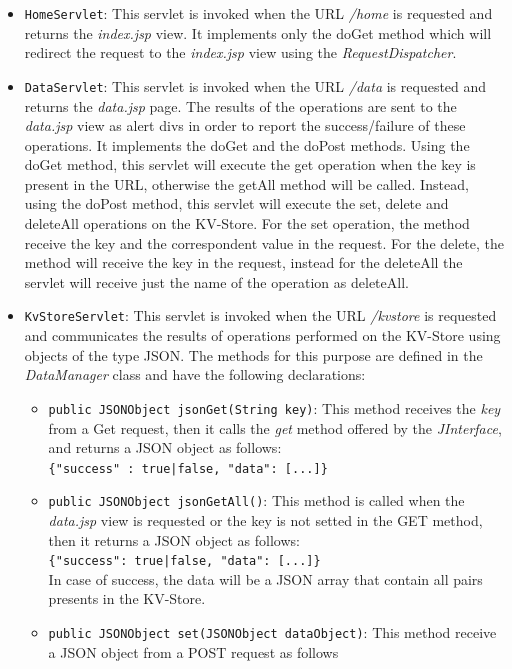 \documentclass[a4paper]{article}
\begin{document}
\begin{itemize}
    \item \texttt{HomeServlet}: This servlet is invoked when the URL \textit{/home} is requested and returns the \emph{index.jsp} view. It implements only the doGet method which will redirect the request to the \emph{index.jsp} view using the \emph{RequestDispatcher}.
    \item \texttt{DataServlet}: This servlet is invoked when the URL \textit{/data} is requested and returns the \emph{data.jsp} page. The results of the operations are sent to the \emph{data.jsp} view as alert divs in order to report the success/failure of these operations. It implements the doGet and the doPost methods. Using the doGet method, this servlet will execute the get operation when the key is present in the URL, otherwise the getAll method will be called. Instead, using the doPost method, this servlet will execute the set, delete and deleteAll operations on the KV-Store. For the set operation, the method receive the key and the correspondent value in the request. For the delete, the method will receive the key in the request, instead for the deleteAll the servlet will receive just the name of the operation as deleteAll.
    \item \texttt{KvStoreServlet}: This servlet is invoked when the URL \textit{/kvstore} is requested and communicates the results of operations performed on the KV-Store using objects of the type JSON. The methods for this purpose are defined in the \emph{DataManager} class and have the following declarations:
    \begin{itemize}
        \item \texttt{public JSONObject jsonGet(String key)}: This method receives the \emph{key} from a Get request, then it calls the \emph{get} method offered by the \emph{JInterface}, and returns a JSON object as follows:\\
         \verb!{"success" : true|false, "data": [...]}!
        \item \texttt{public JSONObject jsonGetAll()}: This method is called when the \emph{data.jsp} view is requested or the key is not setted in the GET method, then it returns a JSON object as follows:\\
        \verb!{"success": true|false, "data": [...]}!\\
        In case of success, the data will be a JSON array that contain all pairs presents in the KV-Store.
        \item \texttt{public JSONObject set(JSONObject dataObject)}: This method receive a JSON object from a POST request as follows\\

\end{itemize}
\end{itemize}
\end{document}
